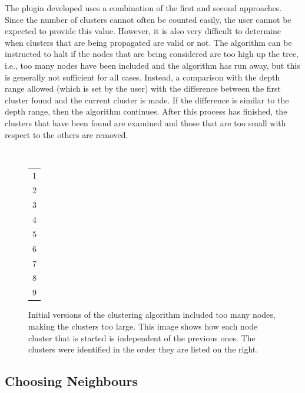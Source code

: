 The plugin developed uses a combination of the first and second approaches.
Since the number of clusters cannot often be counted easily, the user cannot be
expected to provide this value. However, it is also very difficult to determine
when clusters that are being propagated are valid or not. The algorithm can be
instructed to halt if the nodes that are being considered are too high up the
tree, i.e., too many nodes have been included and the algorithm has run away,
but this is generally not sufficient for all cases. Instead, a comparison with
the depth range allowed (which is set by the user) with the difference between
the first cluster found and the current cluster is made. If the difference is
similar to the depth range, then the algorithm continues. After this process
has finished, the clusters that have been found are examined and those that are
too small with respect to the others are removed.

\begin{figure}[tbhp]
	\centering
	\begin{minipage}[c]{7cm}
	\end{minipage}%
	\,
	\begin{minipage}[c]{1cm}
		\centering
		\begin{tabular}[b]{l}
			\cellcolor{lyellow}1 \\
			\cellcolor{lorange}2 \\
			\cellcolor{lbrown}3 \\
			\cellcolor{lgreen}4 \\
			\cellcolor{lblue}5 \\
			\cellcolor{lpurple}6 \\
			\cellcolor{lred}7 \\
			\cellcolor{silver}8 \\
			\cellcolor{lgrey}9 \\
		\end{tabular}
	\end{minipage}

	\caption[Propagation of multiple starting locations.]{Initial versions of
		the clustering algorithm included too many nodes, making the clusters
		too large. This image shows how each node cluster that is started is
		independent of the previous ones. The clusters were identified in the
		order they are listed on the right.}\label{fig:multiple-clusters-colours}
\end{figure}

\subsection{Choosing Neighbours}
\label{sub:choosing_neighbours}

